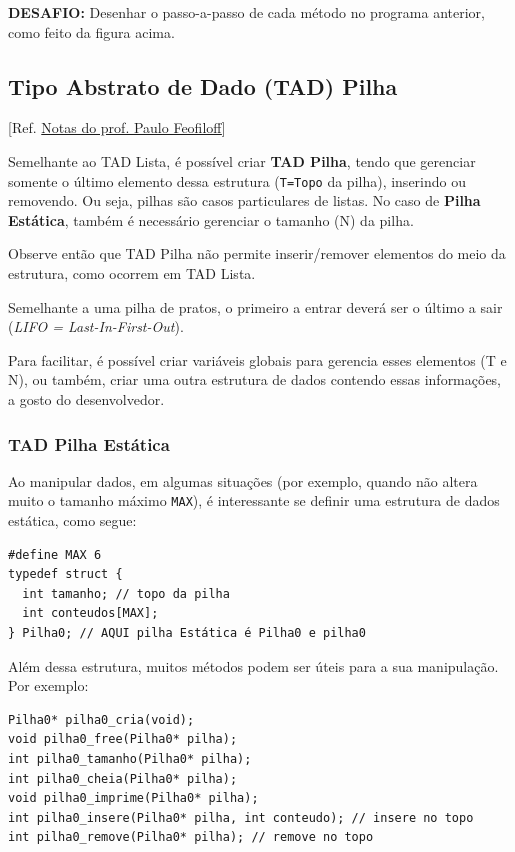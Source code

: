 \documentclass[12pt,a4paper]{article}
\begin{document}
    \textbf{DESAFIO:} Desenhar o passo-a-passo de cada método no programa
anterior, como feito da figura acima.

    \hypertarget{tipo-abstrato-de-dado-tad-pilha}{%
\subsection{Tipo Abstrato de Dado (TAD)
Pilha}\label{tipo-abstrato-de-dado-tad-pilha}}

    {[}Ref.
\href{https://www.ime.usp.br/~pf/algoritmos/aulas/pilha.html}{Notas do
prof. Paulo Feofiloff}{]}

Semelhante ao TAD Lista, é possível criar \textbf{TAD Pilha}, tendo que
gerenciar somente o último elemento dessa estrutura (\texttt{T=Topo} da
pilha), inserindo ou removendo. Ou seja, pilhas são casos particulares
de listas. No caso de \textbf{Pilha Estática}, também é necessário
gerenciar o tamanho (N) da pilha.

Observe então que TAD Pilha não permite inserir/remover elementos do
meio da estrutura, como ocorrem em TAD Lista.

Semelhante a uma pilha de pratos, o primeiro a entrar deverá ser o
último a sair (\emph{LIFO = Last-In-First-Out}).

Para facilitar, é possível criar variáveis globais para gerencia esses
elementos (T e N), ou também, criar uma outra estrutura de dados
contendo essas informações, a gosto do desenvolvedor.

    \hypertarget{tad-pilha-estuxe1tica}{%
\subsubsection{TAD Pilha Estática}\label{tad-pilha-estuxe1tica}}

    Ao manipular dados, em algumas situações (por exemplo, quando não altera
muito o tamanho máximo \texttt{MAX}), é interessante se definir uma
estrutura de dados estática, como segue:

\begin{verbatim}
#define MAX 6
typedef struct {
  int tamanho; // topo da pilha
  int conteudos[MAX];
} Pilha0; // AQUI pilha Estática é Pilha0 e pilha0
\end{verbatim}

Além dessa estrutura, muitos métodos podem ser úteis para a sua
manipulação. Por exemplo:

\begin{verbatim}
Pilha0* pilha0_cria(void);
void pilha0_free(Pilha0* pilha);
int pilha0_tamanho(Pilha0* pilha);
int pilha0_cheia(Pilha0* pilha);
void pilha0_imprime(Pilha0* pilha);
int pilha0_insere(Pilha0* pilha, int conteudo); // insere no topo
int pilha0_remove(Pilha0* pilha); // remove no topo
\end{verbatim}
\end{document}
